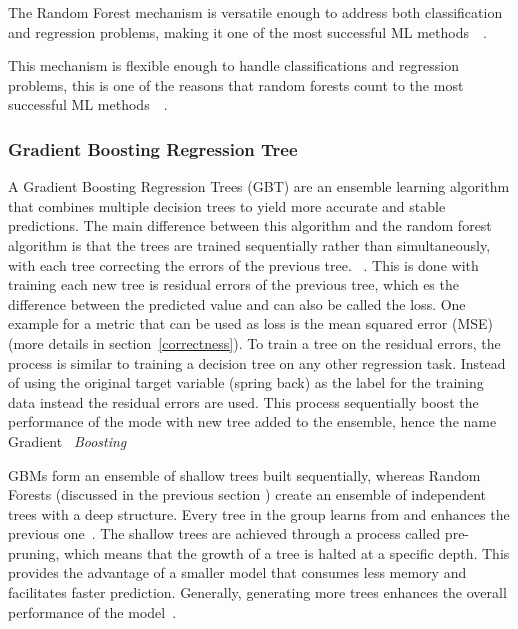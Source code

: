 The Random Forest mechanism is versatile enough to address both classification and regression problems, making it one
of the most successful
\ac{ML} methods~\cite[p. 3--4]{biau_randomforestguided_2016}~\cite[p. 25]{breiman_randomforests_2001}.

This mechanism is flexible enough to handle classifications and regression problems,
this is one of the reasons that random forests count to the most successful \ac{ML}
methods~\cite[p. 3--4]{biau_randomforestguided_2016}~\cite[p. 25]{breiman_randomforests_2001}.

\subsubsection{Gradient Boosting Regression Tree}

A Gradient Boosting Regression Trees (\ac{GBT}) are an ensemble learning algorithm that combines multiple decision trees
to yield more accurate and stable predictions.
The main difference between this algorithm and the random forest algorithm is that the trees are trained sequentially
rather than simultaneously, with each tree correcting the errors of the previous tree.
~\cite[p. 88--89]{muller_introductionmachinelearning_2016}.
This is done with training each new tree is residual errors of the previous tree, which es the
difference between the predicted value and can also be called the loss.
One example for a metric that can be used as loss is the mean squared error (MSE) (more details in
section~\ref{correctness}).
To train a tree on the residual errors, the process is similar to training a decision tree on any other regression
task.
Instead of using the original target variable (spring back) as the label for the training data instead the
residual errors are used.
This process sequentially boost the performance of the mode with new tree added to the
ensemble, hence the name Gradient ~\textit{Boosting}~\cite[p. 222]{boehmke2019hands}

GBMs form an ensemble of shallow trees built sequentially, whereas Random Forests (discussed in the previous section
) create an ensemble of independent trees with a deep structure.
Every tree in the group learns from and enhances the previous one~\cite[p. 221]{boehmke2019hands}.
The shallow trees are achieved through a process called pre-pruning, which means that the growth of a tree is halted
at a specific depth.
This provides the advantage of a smaller model that consumes less memory and facilitates faster prediction.
Generally, generating more trees enhances the overall performance of the
model~\cite[p. 88--89]{muller_introductionmachinelearning_2016}.

